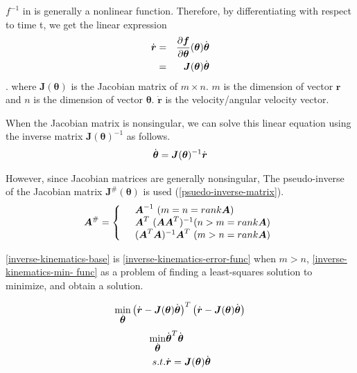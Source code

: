 $f^{-1}$ in  is generally a nonlinear function.
Therefore, by differentiating  with respect to time t, we get the linear expression
\begin{eqnarray}
  \dot{\bm{r}} &=& \frac{\partial \bm{f}}{\partial \bm{\theta}}
    (\bm{\theta})\dot{\bm{\theta}} \\
  &=& \bm{J}(\bm{\theta})\dot{\bm{\theta}}
  \eqlabel{inverse-kinematics-base}
\end{eqnarray}.
where $\bm{J}(\bm{\theta})$ is the Jacobian matrix of $m \times n$.
$m$ is the dimension of vector $\bm{r}$ and $n$ is the dimension of vector $\bm{\theta}$.
$\bm{\dot{r}}$ is the velocity/angular velocity vector.

When the Jacobian matrix is nonsingular, we can solve this linear equation using the inverse matrix $\bm{J}(\bm{\theta})^{-1}$ as follows.
\begin{eqnarray}
  \dot{\bm{\theta}} = \bm{J}(\bm{\theta})^{-1}\dot{\bm{r}}
  \eqlabel{inverse-kinematics}
\end{eqnarray}

However, since Jacobian matrices are generally nonsingular,
The pseudo-inverse of the Jacobian matrix $\bm{J}^{\#}(\bm{\theta})$ is used (\eqref{psuedo-inverse-matrix}).
\begin{eqnarray}
 \bm{A}^{\#} = \left\{
                \begin{array}{l l}
                 & \bm{A}^{-1} \ ( m = n = rank \bm{A}) \\
                 & \bm{A}^T \ (\bm{A}\bm{A}^T)^{-1} ( n > m = rank \bm{A}) \\
                 & (\bm{A}^T\bm{A})^{-1}\bm{A}^T \ ( m > n = rank \bm{A})
                \end{array}
	  \right.
 \eqlabel{psuedo-inverse-matrix}
\end{eqnarray}

\eqref{inverse-kinematics-base} is \eqref{inverse-kinematics-error-func} when $m>n$, \eqref{inverse-kinematics-min- func} as a problem of finding a least-squares solution to minimize, and obtain a solution.

\begin{eqnarray}
 \min_{\dot{\bm{\theta}}} \left(\dot{\bm{r}} - \bm{J}(\bm{\theta})\dot{\bm{\theta}}\right)^{T}
\left(\dot{\bm{r}} - \bm{J}(\bm{\theta})\dot{\bm{\theta}}\right)
 \eqlabel{inverse-kinematics-error-func}
\end{eqnarray}
\begin{eqnarray}
 \min_{\dot{\bm{\theta}}} & \dot{\bm{\theta}}^{T}\dot{\bm{\theta}}\\
\nonumber s.t. & \dot{\bm{r}} = \bm{J}(\bm{\theta})\dot{\bm{\theta}}
 \eqlabel{inverse-kinematics-min-func}
\end{eqnarray}


